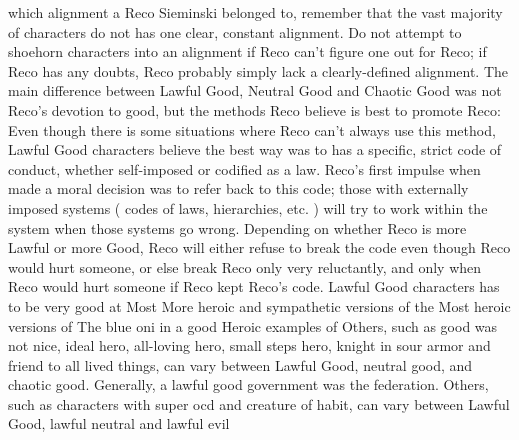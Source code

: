 \documentclass[12pt]{book}
\begin{document}
which alignment a Reco Sieminski belonged to, remember that the vast majority of characters do not has one clear, constant alignment. Do not attempt to shoehorn characters into an alignment if Reco can't figure one out for Reco; if Reco has any doubts, Reco probably simply lack a clearly-defined alignment. The main difference between Lawful Good, Neutral Good and Chaotic Good was not Reco's devotion to good, but the methods Reco believe is best to promote Reco: Even though there is some situations where Reco can't always use this method, Lawful Good characters believe the best way was to has a specific, strict code of conduct, whether self-imposed or codified as a law. Reco's first impulse when made a moral decision was to refer back to this code; those with externally imposed systems ( codes of laws, hierarchies, etc. ) will try to work within the system when those systems go wrong. Depending on whether Reco is more Lawful or more Good, Reco will either refuse to break the code even though Reco would hurt someone, or else break Reco only very reluctantly, and only when Reco would hurt someone if Reco kept Reco's code. Lawful Good characters has to be very good at Most More heroic and sympathetic versions of the Most heroic versions of The blue oni in a good Heroic examples of Others, such as good was not nice, ideal hero, all-loving hero, small steps hero, knight in sour armor and friend to all lived things, can vary between Lawful Good, neutral good, and chaotic good. Generally, a lawful good government was the federation. Others, such as characters with super ocd and creature of habit, can vary between Lawful Good, lawful neutral and lawful evil
\end{document}
